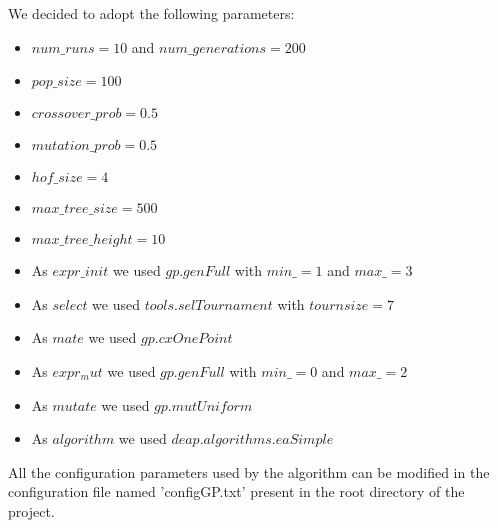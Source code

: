 We decided to adopt the following parameters:
\begin{itemize}
    \item $num\_runs = 10$ and $num\_generations = 200$
    \item $pop\_size = 100$
    \item $crossover\_prob = 0.5$
    \item $mutation\_prob = 0.5$
    \item $hof\_size = 4$
    \item $max\_tree\_size = 500$
    \item $max\_tree\_height = 10$
    \item As $expr\_init$ we used $gp.genFull$ with $min\_ = 1$ and $max\_ = 3$
    \item As $select$ we used $tools.selTournament$ with $tournsize = 7$
    \item As $mate$ we used $gp.cxOnePoint$
    \item As $expr_mut$ we used $gp.genFull$ with $min\_ = 0$ and $max\_ = 2$
    \item As $mutate$ we used $gp.mutUniform$
    \item As $algorithm$ we used $deap.algorithms.eaSimple$
    
\end{itemize}

All the configuration parameters used by the algorithm can be modified in the configuration
file named 'configGP.txt' present in the root directory of the project.

    